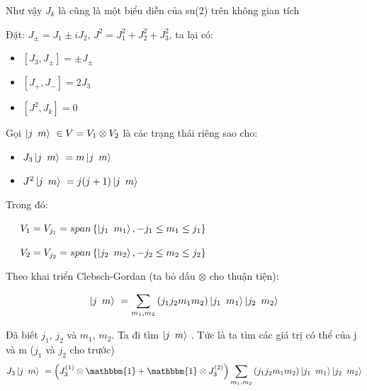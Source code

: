 \documentclass{report}
\begin{document}
Như vậy \( J_{k} \) là cũng là một biểu diễn của su(2) trên không gian tích

Đặt: \( J_{\pm} = J_{1} \pm i J_{2} \), \( J^{2} = J_{1}^{2} + J_{2}^{2} + J_{3}^{2} \), ta lại có:
	
	\begin{itemize}
		\item \( [J_{3},J_{\pm}] = \pm J_{\pm} \)
		\item \( [J_{+},J_{-}] = 2 J_{3} \)
		\item \( \left[ J^{2}, J_{k} \right] = 0\)
	\end{itemize}
	
Gọi \( \left| j \enskip m \right\rangle\ \in V = V_{1} \otimes V_{2} \) là các trạng thái riêng sao cho:
	\begin{itemize}
		\item \(J_{3} \left| {j \enskip m} \right\rangle\ = m \left| {j \enskip m} \right\rangle\ \)
		\item \(J^{2} \left| {j \enskip m} \right\rangle\ = j(j+1) \left| {j \enskip m} \right\rangle\ \)
	\end{itemize}

Trong đó:

\( \hspace*{0.5cm} V_{1} = V_{j_{1}} = span \left\lbrace \left| j_{1} \enskip m_{1} \right\rangle, -j_{1} \leq m_{1} \leq j_{1} \right\rbrace \)

\( \hspace*{0.5cm} V_{2} = V_{j_{2}} = span \left\lbrace \left| j_{2} \enskip m_{2} \right\rangle, -j_{2} \leq m_{2} \leq j_{2} \right\rbrace \)

Theo khai triển Clebsch-Gordan (ta bỏ dấu \( \otimes \) cho thuận tiện):

\[ \left| {j \enskip m} \right\rangle\ = \sum_{m_{1},m_{2}} \left( j_{1} j_{2} m_{1} m_{2} \right) \left| j_{1} \enskip m_{1} \right\rangle \left| j_{2} \enskip m_{2} \right\rangle \]

Đã biết \(j_{1}\), \(j_{2}\) và \(m_{1}\), \(m_{2}\). Ta đi tìm \( \left| {j \enskip m} \right\rangle\ \). Tức là ta tìm các giá trị có thể của j và m (\(j_{1}\) và \(j_{2}\) cho trước)
	\begin{align*}
		J_{3} \left| {j \enskip m} \right\rangle\ = \left( J_{3}^{(1)} \otimes \mathbbm{1} +  \mathbbm{1} \otimes J_{3}^{(2)} \right) \sum_{m_{1},m_{2}} \left( j_{1} j_{2} m_{1} m_{2} \right) \left| j_{1} \enskip m_{1} \right\rangle \left| j_{2} \enskip m_{2} \right\rangle
	\end{align*}
	
\end{document}
